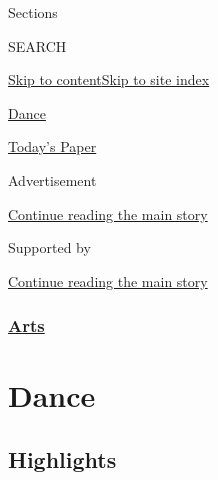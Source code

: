 Sections

SEARCH

\protect\hyperlink{site-content}{Skip to
content}\protect\hyperlink{site-index}{Skip to site index}

\href{https://www.nytimes3xbfgragh.onion/section/arts/dance}{Dance}

\href{https://myaccount.nytimes3xbfgragh.onion/auth/login?response_type=cookie\&client_id=vi}{}

\href{https://www.nytimes3xbfgragh.onion/section/todayspaper}{Today's
Paper}

Advertisement

\protect\hyperlink{after-top}{Continue reading the main story}

Supported by

\protect\hyperlink{after-sponsor}{Continue reading the main story}

\hypertarget{arts}{%
\subsubsection{\texorpdfstring{\href{/section/arts}{Arts}}{Arts}}\label{arts}}

\hypertarget{dance}{%
\section{Dance}\label{dance}}

\hypertarget{highlights}{%
\subsection{Highlights}\label{highlights}}

